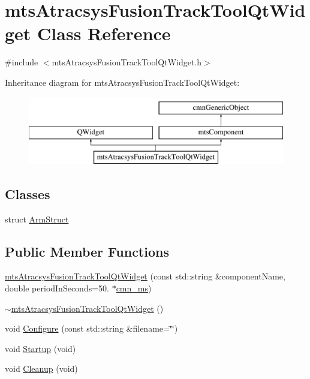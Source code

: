 \hypertarget{classmts_atracsys_fusion_track_tool_qt_widget}{}\section{mts\+Atracsys\+Fusion\+Track\+Tool\+Qt\+Widget Class Reference}
\label{classmts_atracsys_fusion_track_tool_qt_widget}


{\ttfamily \#include $<$mts\+Atracsys\+Fusion\+Track\+Tool\+Qt\+Widget.\+h$>$}

Inheritance diagram for mts\+Atracsys\+Fusion\+Track\+Tool\+Qt\+Widget\+:\begin{figure}[H]
\begin{center}
\leavevmode
\includegraphics[height=3.000000cm]{d9/df7/classmts_atracsys_fusion_track_tool_qt_widget}
\end{center}
\end{figure}
\subsection*{Classes}
\begin{DoxyCompactItemize}
\item 
struct \hyperlink{structmts_atracsys_fusion_track_tool_qt_widget_1_1_arm_struct}{Arm\+Struct}
\end{DoxyCompactItemize}
\subsection*{Public Member Functions}
\begin{DoxyCompactItemize}
\item 
\hyperlink{classmts_atracsys_fusion_track_tool_qt_widget_ad2cf469f72fc7b248eb96c2ab9395daa}{mts\+Atracsys\+Fusion\+Track\+Tool\+Qt\+Widget} (const std\+::string \&component\+Name, double period\+In\+Seconds=50. $\ast$\hyperlink{cmn_units_8h_aaf4d3f2fafb9b4a95606544b9d876b4a}{cmn\+\_\+ms})
\item 
\hyperlink{classmts_atracsys_fusion_track_tool_qt_widget_a1ada221bab1c189135e42cf341492eb6}{$\sim$mts\+Atracsys\+Fusion\+Track\+Tool\+Qt\+Widget} ()
\item 
void \hyperlink{classmts_atracsys_fusion_track_tool_qt_widget_a14655fd69133bbd614ab0a635ce3b4f5}{Configure} (const std\+::string \&filename=\char`\"{}\char`\"{})
\item 
void \hyperlink{classmts_atracsys_fusion_track_tool_qt_widget_a3b822b602533c3e3feffba610e48063f}{Startup} (void)
\item 
void \hyperlink{classmts_atracsys_fusion_track_tool_qt_widget_acddcbfa40ea675d0c9176756be157f38}{Cleanup} (void)
\end{DoxyCompactItemize}
